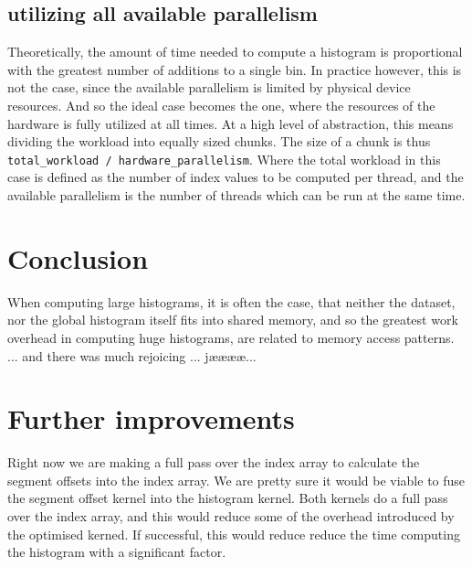 \documentclass[12pt, a4paper, hidelinks]{article}
\renewcommand{\tt}[1]{\texttt{#1}}
\begin{document}
\subsection{utilizing all available parallelism}
Theoretically, the amount of time needed to compute a histogram is
proportional with the greatest number of additions to a single bin.
In practice however, this is not the case,
since the available parallelism is limited by physical device resources.
And so the ideal case becomes the one,
where the resources of the hardware is fully utilized at all times.
At a high level of abstraction, this means dividing the workload into
equally sized chunks. The size of a chunk is thus
\tt{total\_workload / hardware\_parallelism}.
Where the total workload in this case is defined as the number of index values
to be computed per thread, and the available parallelism is the number of
threads which can be run at the same time.

\section{Conclusion}
When computing large histograms,
it is often the case, that neither the dataset,
nor the global histogram itself fits into shared memory,
and so the greatest work overhead in computing huge histograms,
are related to memory access patterns. ... and there was much rejoicing ... jææææ...

\section{Further improvements}
Right now we are making a full pass over the index array to calculate
the segment offsets into the index array.
We are pretty sure it would be viable to fuse the segment offset
kernel into the histogram kernel.
Both kernels do a full pass over the index array,
and this would reduce some of the overhead introduced
by the optimised kerned. If successful,
this would reduce reduce the time computing the histogram with a significant factor.


\end{document}
